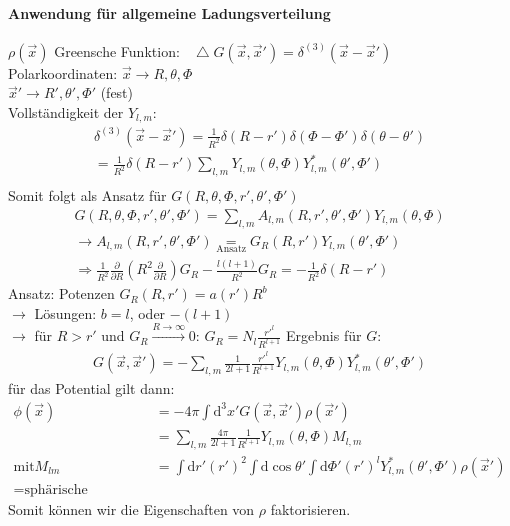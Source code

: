 \documentclass[a4paper]{article}
\newcommand*\laplace{\mathop{}\!\mathbin\bigtriangleup}
\begin{document}
\paragraph{Anwendung für allgemeine Ladungsverteilung} $\rho(\vec{x})$
Greensche Funktion: $\laplace
G(\vec{x},\vec{x}')=\delta^{(3)}(\vec{x}-\vec{x}')$\\
Polarkoordinaten: $\vec{x}\rightarrow R,\theta,\Phi$\\
$\vec{x}'\rightarrow R',\theta',\Phi'$ (fest)\\
Vollständigkeit der $Y_{l,m}$:
\begin{align}
\delta^{(3)}(\vec{x}-\vec{x}')=\frac{1}{R^2}
\delta(R-r')\delta(\Phi-\Phi')\delta(\theta-\theta')\\
=\frac{1}{R^2}\delta(R-r')\sum_{l,m}Y_{l,m}(\theta,\Phi)Y^*_{l,m}(\theta',\Phi')\\
\end{align}
Somit folgt als Ansatz für $G(R,\theta,\Phi,r',\theta',\Phi')$
\begin{align}
G(R,\theta,\Phi,r',\theta',\Phi')=
\sum_{l,m}A_{l,m}(R,r',\theta',\Phi')Y_{l,m}(\theta,\Phi)\\
\rightarrow
A_{l,m}(R,r',\theta',\Phi')\underset{\text{Ansatz}}{=}G_R(R,r')
Y_{l,m}(\theta',\Phi')\\
\Rightarrow \frac{1}{R^2}\frac{\partial}{\partial R}\left( R^2
\frac{\partial}{\partial R} \right)
G_R-\frac{l(l+1)}{R^2}G_R=-\frac{1}{R^2}\delta(R-r')
\end{align}
Ansatz: Potenzen $G_R(R,r')=a(r')R^b$\\
$\rightarrow$ Lösungen: $b=l$, oder $-(l+1)$\\
$\rightarrow$ für $R>r'$ und $G_R \overset{R\rightarrow\infty}{\rightarrow}0$:
$G_R=N_l\frac{r'^l}{R^{l+1}}$
Ergebnis für $G$:
\begin{align}
G(\vec{x},\vec{x}')=-\sum_{l,m}\frac{1}{2l+1}\frac{r'^l}{R^{l+1}}
Y_{l,m}(\theta,\Phi)Y^*_{l,m}(\theta',\Phi')
\end{align}
für das Potential gilt dann:
\begin{align}
\phi(\vec{x})&=-4\pi\int \mathrm{d}^3x' G(\vec{x},\vec{x}')\rho(\vec{x}')\\
&=\sum_{l,m}\frac{4\pi}{2l+1}\frac{1}{R^{l+1}}Y_{l,m}(\theta,\Phi)M_{l,m}\\
\text{mit} M_{lm}&=\int \mathrm{d}r' (r')^2 \int \mathrm{d}\cos\theta'\int \mathrm{d}\Phi' (r')^l
Y^*_{l,m}(\theta',\Phi') \rho(\vec{x}')\\=\text{sphärische Multipolmomente}
\end{align}
Somit können wir die Eigenschaften von $\rho$ faktorisieren.
\end{document}
